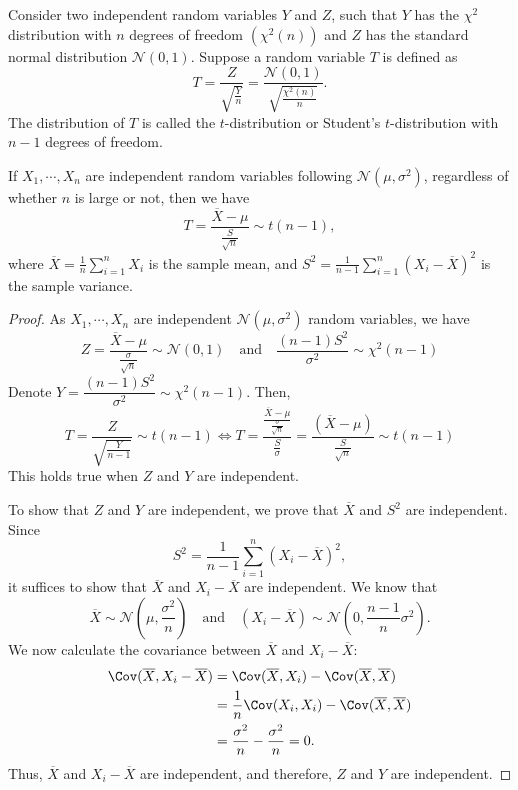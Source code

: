 Consider two independent random variables \(Y\) and \(Z\), such that \(Y\) has the \(\chi^2\) distribution with \(n\) degrees of freedom \((\chi^2(n))\) and \(Z\) has the standard normal distribution \(\mathcal{N}(0, 1)\). Suppose a random variable \(T\) is defined as
\[
  T = \dfrac{Z}{\sqrt{\frac{Y}{n}}} = \dfrac{\mathcal{N}(0, 1)}{\sqrt{\frac{\chi^2(n)}{n}}}.
\]
The distribution of \(T\) is called the \(t\)-distribution or Student's \(t\)-distribution with \(n - 1\) degrees of freedom.

\begin{theorem}
  If \(X_1, \cdots, X_n\) are independent random variables following \(\mathcal{N}(\mu, \sigma^2)\), regardless of whether \(n\) is large or not, then we have
  \[
    T = \frac{\overline{X} - \mu}{\frac{S}{\sqrt{n}}} \sim t(n - 1),
  \]
  where \(\overline{X} = \frac{1}{n}\sum_{i = 1}^n X_i\) is the sample mean, and \(S^2 = \frac{1}{n - 1}\sum_{i = 1}^n (X_i - \overline{X})^2\) is the sample variance.
  
  \begin{proof}
    As \(X_1, \cdots, X_n\) are independent \(\mathcal{N}(\mu, \sigma^2)\) random variables, we have 
    \[
      Z = \dfrac{\overline{X} - \mu}{\frac{\sigma}{\sqrt{n}}} \sim \mathcal{N}(0, 1) \quad \text{and} \quad \dfrac{(n - 1)S^2}{\sigma^2} \sim \chi^2(n - 1)
    \]
    Denote \(Y = \dfrac{(n - 1)S^2}{\sigma^2} \sim \chi^2(n - 1)\). Then,
    \[
      T = \dfrac{Z}{\sqrt{\frac{Y}{n - 1}}} \sim t(n - 1) \Longleftrightarrow T = \dfrac{\frac{\overline{X} - \mu}{\frac{\sigma}{\sqrt{n}}}}{\frac{S}{\sigma}} = \dfrac{(\overline{X} - \mu)}{\frac{S}{\sqrt{n}}} \sim t(n - 1)
    \]
    This holds true when \(Z\) and \(Y\) are independent. 
  
    To show that \(Z\) and \(Y\) are independent, we prove that \(\overline{X}\) and \(S^2\) are independent. Since
    \[
      S^2 = \frac{1}{n-1} \sum_{i=1}^{n} (X_i - \overline{X})^2,
    \]
    it suffices to show that \(\overline{X}\) and \(X_i - \overline{X}\) are independent. We know that
    \[
      \overline{X} \sim \mathcal{N}\left(\mu, \dfrac{\sigma^2}{n}\right) \quad \text{and} \quad (X_i - \overline{X}) \sim \mathcal{N} \left(0, \frac{n - 1}{n} \sigma^2\right).
    \]
    We now calculate the covariance between \(\overline{X}\) and \(X_i - \overline{X}\):
    \[
      \begin{aligned}
        \Cov(\overline{X}, X_i - \overline{X}) &= \Cov(\overline{X}, X_i) - \Cov(\overline{X}, \overline{X}) \\
        &= \dfrac{1}{n}\Cov(X_i, X_i) - \Cov(\overline{X}, \overline{X}) \\
        &= \dfrac{\sigma^2}{n} - \dfrac{\sigma^2}{n} = 0.
      \end{aligned}
    \]
    Thus, \(\overline{X}\) and \(X_i - \overline{X}\) are independent, and therefore, \(Z\) and \(Y\) are independent.
  \end{proof}
  \end{theorem}
  

